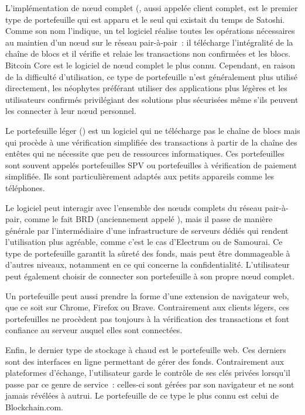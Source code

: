 L'implémentation de nœud complet (, aussi appelée client complet, est le premier type de portefeuille qui est apparu et le seul qui existait du temps de Satoshi. Comme son nom l'indique, un tel logiciel réalise toutes les opérations nécessaires au maintien d'un nœud sur le réseau pair-à-pair~: il télécharge l'intégralité de la chaîne de blocs et il vérifie et relaie les transactions non confirmées et les blocs. Bitcoin Core est le logiciel de nœud complet le plus connu. Cependant, en raison de la difficulté d'utilisation, ce type de portefeuille n'est généralement plus utilisé directement, les néophytes préférant utiliser des applications plus légères et les utilisateurs confirmés privilégiant des solutions plus sécurisées même s'ils peuvent les connecter à leur nœud personnel.

Le portefeuille léger () est un logiciel qui ne télécharge pas le chaîne de blocs mais qui procède à une vérification simplifiée des transactions à partir de la chaîne des entêtes qui ne nécessite que peu de ressources informatiques. Ces portefeuilles sont souvent appelés portefeuilles SPV ou portefeuilles à vérification de paiement simplifiée. Ils sont particulièrement adaptés aux petits appareils comme les téléphones. 

Le logiciel peut interagir avec l'ensemble des nœuds complets du réseau pair-à-pair, comme le fait BRD (anciennement appelé ), mais il passe de manière générale par l'intermédiaire d'une infrastructure de serveurs dédiés qui rendent l'utilisation plus agréable, comme c'est le cas d'Electrum ou de Samourai. Ce type de portefeuille garantit la sûreté des fonds, mais peut être dommageable à d'autres niveaux, notamment en ce qui concerne la confidentialité. L'utilisateur peut également choisir de connecter son portefeuille à son propre nœud complet.

Un portefeuille peut aussi prendre la forme d'une extension de navigateur web, que ce soit sur Chrome, Firefox ou Brave. Contrairement aux clients légers, ces portefeuilles ne procèdent pas toujours à la vérification des transactions et font confiance au serveur auquel elles sont connectées.

Enfin, le dernier type de stockage à chaud est le portefeuille web. Ces derniers sont des interfaces en ligne permettant de gérer des fonds. Contrairement aux plateformes d'échange, l'utilisateur garde le contrôle de ses clés privées lorsqu'il passe par ce genre de service~: celles-ci sont gérées par son navigateur et ne sont jamais révélées à autrui. Le portefeuille de ce type le plus connu est celui de Blockchain.com.

